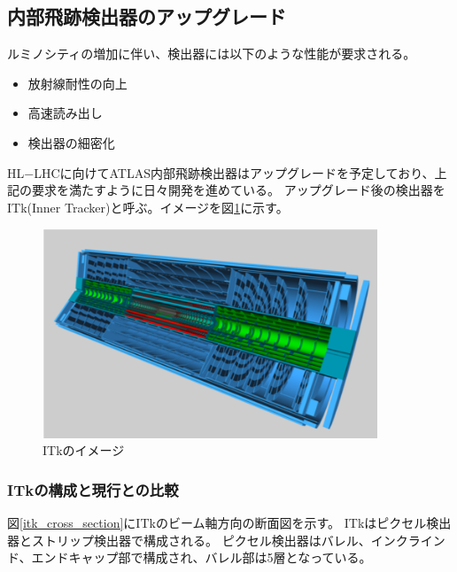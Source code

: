 \subsection{内部飛跡検出器のアップグレード}
ルミノシティの増加に伴い、検出器には以下のような性能が要求される。
\begin{itemize}
  \item 放射線耐性の向上
  \item 高速読み出し
  \item 検出器の細密化
\end{itemize}

HL$-$LHCに向けてATLAS内部飛跡検出器はアップグレードを予定しており、上記の要求を満たすように日々開発を進めている。
アップグレード後の検出器をITk(Inner Tracker)と呼ぶ。イメージを図\ref{itk_image}に示す。

\begin{figure}[bpt]\centering
\includegraphics[width=10cm]{itk_image}
\caption[ITkのイメージ]{ITkのイメージ\cite{1-3}}
\label{itk_image}
\end{figure}

\subsubsection{ITkの構成と現行との比較}
図\ref{itk_cross_section}にITkのビーム軸方向の断面図を示す。
ITkはピクセル検出器とストリップ検出器で構成される。
ピクセル検出器はバレル、インクラインド、エンドキャップ部で構成され、バレル部は5層となっている。

